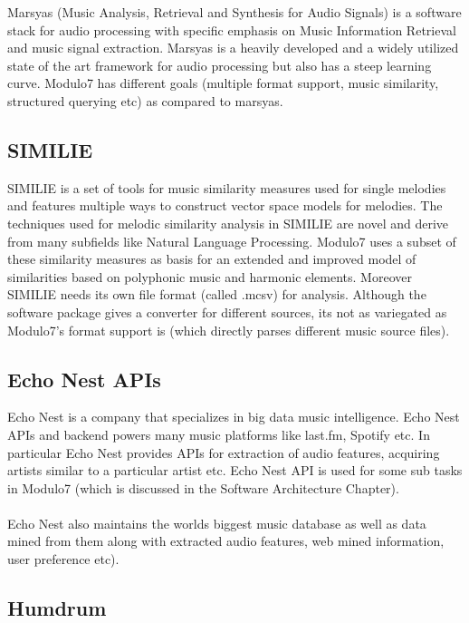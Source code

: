 \noindent Marsyas \cite{marsyas} (Music Analysis, Retrieval and Synthesis for Audio Signals) is a software stack for audio processing with specific emphasis on Music Information Retrieval and music signal extraction. Marsyas is a heavily developed and a widely utilized state of the art framework for audio processing but also has a steep learning curve. Modulo7 has different goals (multiple format support, music similarity, structured querying etc) as compared to marsyas.

\subsection{SIMILIE}

\noindent SIMILIE \cite{similie} is a set of tools for music similarity measures used for single  melodies and features multiple ways to construct vector space models for melodies. The techniques used for melodic similarity analysis in SIMILIE are novel and derive from many subfields like Natural Language Processing. Modulo7 uses a subset of these similarity measures as basis for an extended and improved model of similarities based on polyphonic music and harmonic elements. Moreover SIMILIE needs its own file format (called .mcsv) for analysis. Although the software package gives a converter for different sources, its not as variegated as Modulo7's format support is (which directly parses different music source files).

\subsection{Echo Nest APIs}

\noindent Echo Nest is a company that specializes in big data music intelligence. Echo Nest APIs and backend powers many music platforms like last.fm, Spotify etc. In particular Echo Nest provides APIs for extraction of audio features, acquiring artists similar to a particular artist etc. Echo Nest API is used for some sub tasks in Modulo7 (which is discussed in the Software Architecture Chapter). \\\\
Echo Nest also maintains the worlds biggest music database as well as data mined from them along with extracted audio features, web mined information, user preference etc). 

\subsection{Humdrum}

